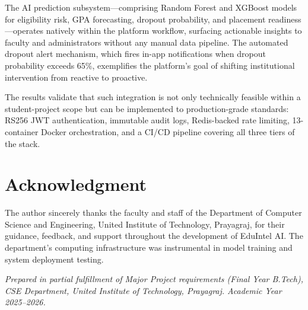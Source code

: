 \documentclass[conference]{IEEEtran}
\begin{document}
The AI prediction subsystem---comprising Random Forest and XGBoost models for
eligibility risk, GPA forecasting, dropout probability, and placement
readiness---operates natively within the platform workflow, surfacing actionable
insights to faculty and administrators without any manual data pipeline. The
automated dropout alert mechanism, which fires in-app notifications when dropout
probability exceeds 65\%, exemplifies the platform's goal of shifting
institutional intervention from reactive to proactive.

The results validate that such integration is not only technically feasible
within a student-project scope but can be implemented to production-grade
standards: RS256 JWT authentication, immutable audit logs, Redis-backed rate
limiting, 13-container Docker orchestration, and a CI/CD pipeline covering all
three tiers of the stack.

\section*{Acknowledgment}

The author sincerely thanks the faculty and staff of the Department of Computer
Science and Engineering, United Institute of Technology, Prayagraj, for their
guidance, feedback, and support throughout the development of EduIntel AI. The
department's computing infrastructure was instrumental in model training and
system deployment testing.

\textit{Prepared in partial fulfillment of Major Project requirements (Final
Year B.Tech), CSE Department, United Institute of Technology, Prayagraj.
Academic Year 2025--2026.}
\end{document}
